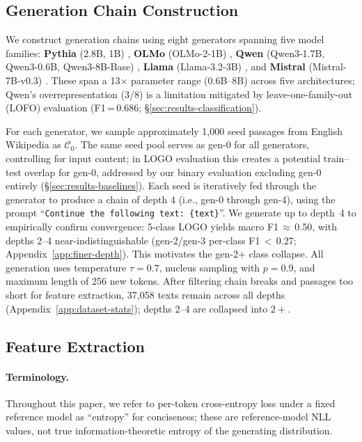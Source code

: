 \subsection{Generation Chain Construction}
\label{sec:generation}

 We construct generation chains using eight generators spanning five model families: \textbf{Pythia} (2.8B, 1B) \cite{pythia}, \textbf{OLMo} (OLMo-2-1B) \cite{olmo}, \textbf{Qwen} (Qwen3-1.7B, Qwen3-0.6B, Qwen3-8B-Base) \cite{qwen3}, \textbf{Llama} (Llama-3.2-3B) \cite{llama3}, and \textbf{Mistral} (Mistral-7B-v0.3) \cite{mistral7b}.
 These span a 13$\times$ parameter range (0.6B--8B) across five architectures; Qwen's overrepresentation (3/8) is a limitation mitigated by leave-one-family-out (LOFO) evaluation (F1\,=\,0.686; \S\ref{sec:results-classification}).

 For each generator, we sample approximately 1{,}000 seed passages from English Wikipedia as $\mathcal{C}_0$.
The same seed pool serves as gen-0 for all generators, controlling for input content; in LOGO evaluation this creates a potential train--test overlap for gen-0, addressed by our binary evaluation excluding gen-0 entirely (\S\ref{sec:results-baselines}).
Each seed is iteratively fed through the generator to produce a chain of depth 4 (i.e., gen-0 through gen-4), using the prompt ``\texttt{Continue the following text: \{text\}}''.
We generate up to depth~4 to empirically confirm convergence: 5-class LOGO yields macro F1\,$\approx$\,0.50, with depths 2--4 near-indistinguishable (gen-2/gen-3 per-class F1\,$<$\,0.27; Appendix~\ref{app:finer-depth}). This motivates the gen-2+ class collapse.
All generation uses temperature $\tau{=}0.7$, nucleus sampling with $p{=}0.9$, and maximum length of 256 new tokens.
After filtering chain breaks and passages too short for feature extraction, 37{,}058 texts remain across all depths (Appendix~\ref{app:dataset-stats}); depths 2--4 are collapsed into $2{+}$.

\subsection{Feature Extraction}
\label{sec:features}

\paragraph{Terminology.} Throughout this paper, we refer to per-token cross-entropy loss under a fixed reference model as ``entropy'' for conciseness; these are reference-model NLL values, not true information-theoretic entropy of the generating distribution.

